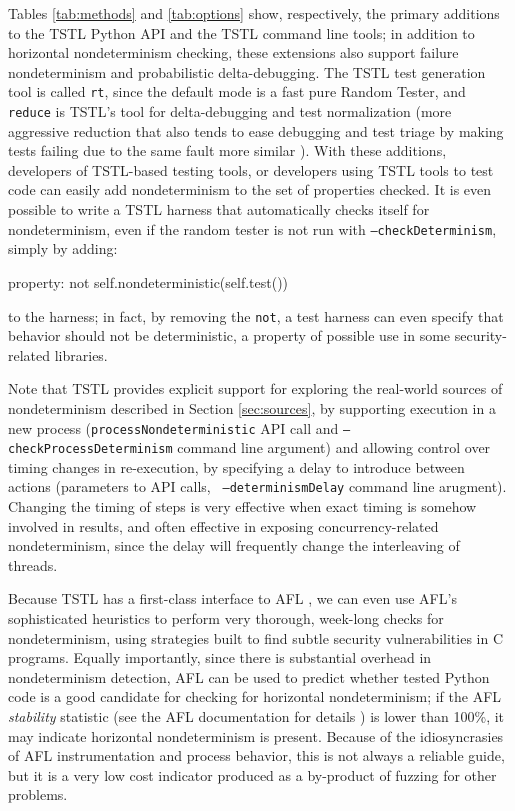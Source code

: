  Tables \ref{tab:methods}
and \ref{tab:options} show, respectively, the primary additions to the
TSTL Python API and the TSTL command line tools; in addition to
horizontal nondeterminism checking, these extensions also support failure
nondeterminism and probabilistic delta-debugging.  The TSTL test
generation tool is called {\tt rt}, since the default mode is a fast
pure Random Tester, and {\tt reduce} is TSTL's tool for
delta-debugging and test
normalization (more aggressive reduction that also tends to ease
debugging and test triage by making tests failing due to the same
fault more similar \cite{onetest}).  With these additions,
developers of TSTL-based testing tools, or developers using TSTL tools
to test code can easily add nondeterminism to the set of properties
checked.  It is even possible to write a TSTL harness that
automatically checks itself for nondeterminism, even if the random
tester is not run with {\tt --checkDeterminism}, simply by adding:

{\scriptsize
\begin{code}
property: not self.nondeterministic(self.test())
\end{code}
}

\noindent to the harness; in fact, by removing the {\tt not}, a test harness can
even specify that behavior should not be deterministic, a property of
possible use in some security-related libraries.

Note that TSTL provides explicit support for exploring the real-world sources of
nondeterminism described in Section \ref{sec:sources}, by supporting
execution in a new process ({\tt processNondeterministic} API call and
{\tt --checkProcessDeterminism} command line argument) and allowing
control over timing changes in re-execution, by specifying a delay to
introduce between actions (parameters to API calls, {\tt
  --determinismDelay} command line arugment).  Changing the timing of
steps is very effective when exact timing is somehow involved in
results, and often effective in exposing concurrency-related
nondeterminism, since the delay will frequently change the
interleaving of threads.

Because TSTL has a first-class interface to AFL \cite{aflfuzz}, we can even use
AFL's sophisticated heuristics to perform very thorough, week-long
checks for nondeterminism, using strategies built to find subtle
security vulnerabilities in C programs.  Equally importantly, since
there is substantial overhead in nondeterminism detection, AFL can be
used to predict whether tested Python code is a good candidate for
checking for horizontal nondeterminism; if the
AFL \emph{stability} statistic (see the AFL documentation for details
\cite{aflfuzz}) is lower than 100\%, it may indicate horizontal
nondeterminism is present.
Because of the idiosyncrasies of AFL instrumentation and process
behavior, this is not always a reliable guide, but it is a very low
cost indicator produced as a by-product of fuzzing for other problems.

